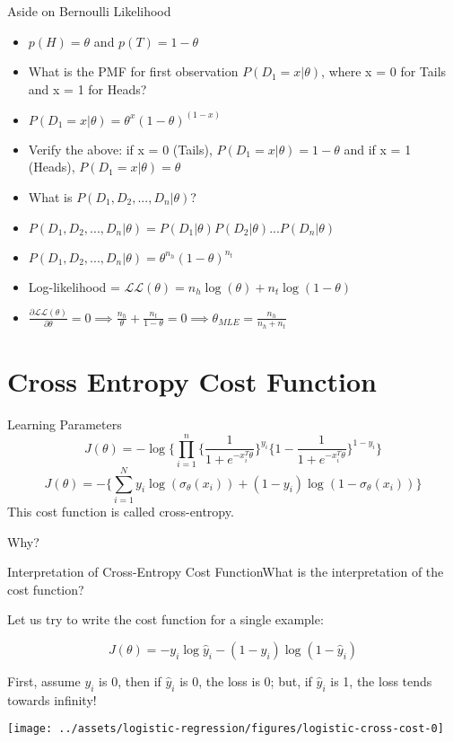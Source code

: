 \documentclass{beamer}
\begin{document}
\begin{frame}{Aside on Bernoulli Likelihood}
\begin{itemize}[<+->]
\item $p(H) = \theta$ and $p(T) = 1 - \theta$
\item What is the PMF for first observation $P(D_1 = x|\theta)$, where x = 0 for Tails and x = 1 for Heads?
\item $P(D_1 = x|\theta) = \theta^x(1-\theta)^{(1-x)}$
\item Verify the above: if x = 0 (Tails), $P(D_1 = x|\theta) = 1 - \theta$ and if x = 1 (Heads), $P(D_1 = x|\theta)  = \theta$
\item What is $P(D_1, D_2, ..., D_n|\theta)$?
\item $P(D_1, D_2, ..., D_n|\theta) = P(D_1|\theta)P(D_2|\theta)...P(D_n|\theta)$
\item $P(D_1, D_2, ..., D_n|\theta) =\theta^{n_h}(1-\theta)^{n_t}$
\item Log-likelihood = $\mathcal{LL}(\theta) = n_h\log(\theta) + n_t\log(1-\theta)$
\item $\frac{\partial \mathcal{LL}(\theta)}{\partial \theta} = 0 \implies \frac{n_h}{\theta} + \frac{n_t}{1-\theta} = 0 \implies \theta_{MLE} = \frac{n_h}{n_h + n_t}$

\end{itemize}

\end{frame}

\section{Cross Entropy Cost Function}
\begin{frame}{Learning Parameters}
\[
J(\theta) = -\log \bigg\{\prod_{i=1}^{n} \Big\{\frac{1}{1 + e^{-x_{i}^T\theta}}\Big\}^{y_{i}}\Big\{1 - \frac{1}{1 + e^{-x_{i}^T\theta}}\Big\}^{1 - y_{i}}\bigg\}
\]
\[
J(\theta) = -\bigg\{\sum_{i=1}^{N} y_{i} \log(\sigma_{\theta}(x_{i})) + (1 - y_{i})\log(1 - \sigma_{\theta}(x_{i}))\bigg\}
\]
\pause This cost function is called cross-entropy.

\pause Why?
\end{frame}

\begin{frame}{Interpretation of Cross-Entropy Cost Function}\pause What is the interpretation of the cost function?

\pause Let us try to write the cost function for a single example:

\pause $$J(\theta) = -y_i\log{\hat{y}_i} - (1-y_i)\log({1-\hat{y}_i})$$

\pause First, assume $y_i$ is 0, then if $\hat{y}_i$ is 0, the loss is 0; but, if $\hat{y}_i$ is 1, the loss tends towards infinity!

	\texttt{[image: ../assets/logistic-regression/figures/logistic-cross-cost-0]}


\end{frame}
\end{document}
